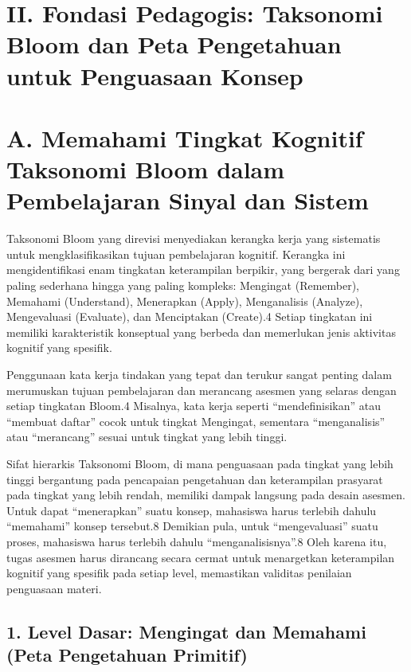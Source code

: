 \documentclass[
  letterpaper,
  DIV=11,
  numbers=noendperiod]{scrreprt}
\begin{document}
\section{II. Fondasi Pedagogis: Taksonomi Bloom dan Peta Pengetahuan
untuk Penguasaan
Konsep}\label{ii.-fondasi-pedagogis-taksonomi-bloom-dan-peta-pengetahuan-untuk-penguasaan-konsep}

\section{A. Memahami Tingkat Kognitif Taksonomi Bloom dalam Pembelajaran
Sinyal dan
Sistem}\label{a.-memahami-tingkat-kognitif-taksonomi-bloom-dalam-pembelajaran-sinyal-dan-sistem}

Taksonomi Bloom yang direvisi menyediakan kerangka kerja yang sistematis
untuk mengklasifikasikan tujuan pembelajaran kognitif. Kerangka ini
mengidentifikasi enam tingkatan keterampilan berpikir, yang bergerak
dari yang paling sederhana hingga yang paling kompleks: Mengingat
(Remember), Memahami (Understand), Menerapkan (Apply), Menganalisis
(Analyze), Mengevaluasi (Evaluate), dan Menciptakan (Create).4 Setiap
tingkatan ini memiliki karakteristik konseptual yang berbeda dan
memerlukan jenis aktivitas kognitif yang spesifik.

Penggunaan kata kerja tindakan yang tepat dan terukur sangat penting
dalam merumuskan tujuan pembelajaran dan merancang asesmen yang selaras
dengan setiap tingkatan Bloom.4 Misalnya, kata kerja seperti
``mendefinisikan'' atau ``membuat daftar'' cocok untuk tingkat
Mengingat, sementara ``menganalisis'' atau ``merancang'' sesuai untuk
tingkat yang lebih tinggi.

Sifat hierarkis Taksonomi Bloom, di mana penguasaan pada tingkat yang
lebih tinggi bergantung pada pencapaian pengetahuan dan keterampilan
prasyarat pada tingkat yang lebih rendah, memiliki dampak langsung pada
desain asesmen. Untuk dapat ``menerapkan'' suatu konsep, mahasiswa harus
terlebih dahulu ``memahami'' konsep tersebut.8 Demikian pula, untuk
``mengevaluasi'' suatu proses, mahasiswa harus terlebih dahulu
``menganalisisnya''.8 Oleh karena itu, tugas asesmen harus dirancang
secara cermat untuk menargetkan keterampilan kognitif yang spesifik pada
setiap level, memastikan validitas penilaian penguasaan materi.

\subsection{1. Level Dasar: Mengingat dan Memahami (Peta Pengetahuan
Primitif)}\label{level-dasar-mengingat-dan-memahami-peta-pengetahuan-primitif}
\end{document}
